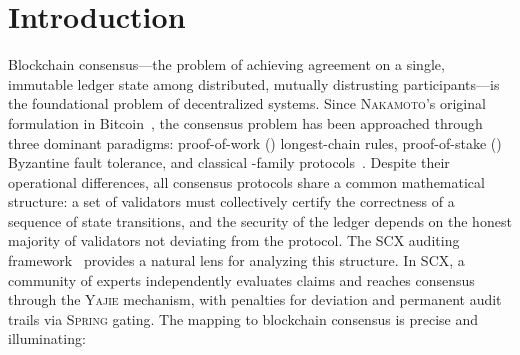 \documentclass[11pt,a4paper]{article}
\theoremstyle{definition}
\newcommand{\Yajie}{\textsc{Yajie}}
\newcommand{\Spring}{\textsc{Spring}}
\newcommand{\SCX}{\textsc{SCX}}
\newcommand{\Nakamoto}{\textsc{Nakamoto}}
\newcommand{\PoW}{\mathrm{PoW}}
\newcommand{\PoS}{\mathrm{PoS}}
\newcommand{\PBFT}{\mathrm{PBFT}}
\begin{document}
\section{Introduction}
Blockchain consensus—the problem of achieving agreement on a single, immutable ledger state among distributed, mutually distrusting participants—is the foundational problem of decentralized systems. Since \Nakamoto's original formulation in Bitcoin~\cite{Nakamoto2008}, the consensus problem has been approached through three dominant paradigms: proof-of-work (\PoW{}) longest-chain rules, proof-of-stake (\PoS{}) Byzantine fault tolerance, and classical \PBFT{}-family protocols~\cite{CastroLiskov1999}. Despite their operational differences, all consensus protocols share a common mathematical structure: a set of validators must collectively certify the correctness of a sequence of state transitions, and the security of the ledger depends on the honest majority of validators not deviating from the protocol.
The \SCX{} auditing framework~\cite{SCX2025} provides a natural lens for analyzing this structure. In \SCX{}, a community of experts independently evaluates claims and reaches consensus through the \Yajie{} mechanism, with penalties for deviation and permanent audit trails via \Spring{} gating. The mapping to blockchain consensus is precise and illuminating:
\end{document}
